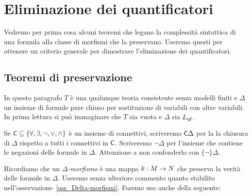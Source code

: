\chapter{Eliminazione dei quantificatori}
\label{eliminazione}

Vedremo per prima cosa alcuni teoremi che legano la complessit\`a sintattica di una formula alla classe di morfismi che la preservano. Useremo questi per ottenere un criterio generale per dimostrare l'eliminazione dei quantificatori. 

 
\section{Teoremi di preservazione}
\label{TeoremidiPreservazione}

In questo paragrafo $T$ \`e una qualunque teoria consistente senza modelli finiti e $\Delta$ un insieme di formule pure chiuso per sostituzione di variabili con altre variabili. In prima lettura si pu\`o immaginare che $T$ sia vuota e $\Delta$ sia $L_{\rm qf}$. 

Se $\textsf{\small C}\subseteq\{\forall,\exists,\neg,\vee,\wedge\}$ \`e un insieme di connettivi, scriveremo \emph{$\textsf{\small C}\Delta$} per la la chiusura di $\Delta$ rispetto a tutti i connettivi in $\textsf{\small C}$. Scriveremo \emph{$\neg\Delta$} per l'insieme che contiene le negazioni delle formule in $\Delta$. Attenzione a non confonderlo con $\{\neg\}\Delta$.





% 
% 



Ricordiamo che un \emph{$\Delta$-morfismo\/} \`e una mappa $k:M\rightarrow N$ che preserva la verit\`a delle formule in $\Delta$. Useremo senza ulteriore commento quanto stabilito nell'osservazione~\ref{oss_Delta-morfismi}. Faremo uso anche della seguente: 

